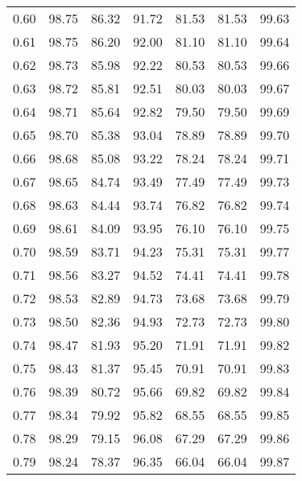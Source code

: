 \begin{tabular}{|c|c|c|c|c|c|c|}
      0.60 &     98.75 &     86.32 &      91.72 &   81.53 &      81.53 &         99.63 \\
      0.61 &     98.75 &     86.20 &      92.00 &   81.10 &      81.10 &         99.64 \\
      0.62 &     98.73 &     85.98 &      92.22 &   80.53 &      80.53 &         99.66 \\
      0.63 &     98.72 &     85.81 &      92.51 &   80.03 &      80.03 &         99.67 \\
      0.64 &     98.71 &     85.64 &      92.82 &   79.50 &      79.50 &         99.69 \\
      0.65 &     98.70 &     85.38 &      93.04 &   78.89 &      78.89 &         99.70 \\
      0.66 &     98.68 &     85.08 &      93.22 &   78.24 &      78.24 &         99.71 \\
      0.67 &     98.65 &     84.74 &      93.49 &   77.49 &      77.49 &         99.73 \\
      0.68 &     98.63 &     84.44 &      93.74 &   76.82 &      76.82 &         99.74 \\
      0.69 &     98.61 &     84.09 &      93.95 &   76.10 &      76.10 &         99.75 \\
      0.70 &     98.59 &     83.71 &      94.23 &   75.31 &      75.31 &         99.77 \\
      0.71 &     98.56 &     83.27 &      94.52 &   74.41 &      74.41 &         99.78 \\
      0.72 &     98.53 &     82.89 &      94.73 &   73.68 &      73.68 &         99.79 \\
      0.73 &     98.50 &     82.36 &      94.93 &   72.73 &      72.73 &         99.80 \\
      0.74 &     98.47 &     81.93 &      95.20 &   71.91 &      71.91 &         99.82 \\
      0.75 &     98.43 &     81.37 &      95.45 &   70.91 &      70.91 &         99.83 \\
      0.76 &     98.39 &     80.72 &      95.66 &   69.82 &      69.82 &         99.84 \\
      0.77 &     98.34 &     79.92 &      95.82 &   68.55 &      68.55 &         99.85 \\
      0.78 &     98.29 &     79.15 &      96.08 &   67.29 &      67.29 &         99.86 \\
      0.79 &     98.24 &     78.37 &      96.35 &   66.04 &      66.04 &         99.87 \\

\end{tabular}
